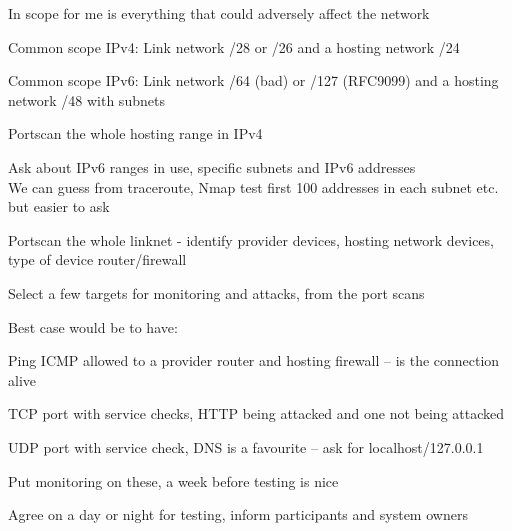 \documentclass[Screen16to9,17pt]{foils}
\begin{document}



\begin{list2}
\item In scope for me is everything that could adversely affect the network
\item Common scope IPv4: Link network /28 or /26 and a hosting network /24
\item Common scope IPv6: Link network /64 (bad) or /127 (RFC9099) and a hosting network /48 with subnets
\end{list2}




\begin{alltt}
\item
\end{alltt}

\begin{list2}
\item Portscan the whole hosting range in IPv4
\item Ask about IPv6 ranges in use, specific subnets and IPv6 addresses\\
We can guess from traceroute, Nmap test first 100 addresses in each subnet etc. but easier to ask
\item Portscan the whole linknet - identify provider devices, hosting network devices, type of device router/firewall
\end{list2}



Select a few targets for monitoring and attacks, from the port scans

Best case would be to have:
\begin{list2}
\item Ping ICMP allowed to a provider router and hosting firewall -- is the connection alive
\item TCP port with service checks, HTTP being attacked and one not being attacked
\item UDP port with service check, DNS is a favourite -- ask for localhost/127.0.0.1
\item Put monitoring on these, a week before testing is nice
\item Agree on a day or night for testing, inform participants and system owners
\end{list2}
\end{document}
